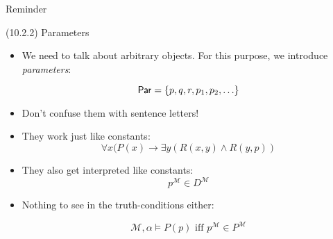 \begin{frame}{Reminder}
\begin{center}
				\end{center}
				
				

\end{frame}

\begin{frame}{(10.2.2) Parameters}

	\begin{itemize}
		
		\item We need to talk about arbitrary objects. For this purpose, we introduce \emph{parameters}:
		
		\[\mathsf{Par}=\{p,q,r,p_1, p_2, \mathellipsis\}\]
		
		\item Don't confuse them with sentence letters!
		
		\item They work just like constants: \[\forall x(P(x)\to \exists y(R(x,y)\land R(y,p))\]
		
		\item They also get interpreted like constants: \[p^\mathcal{M}\in D^\mathcal{M}\]
		
		\item Nothing to see in the truth-conditions either:
		
		\[\mathcal{M},\alpha\vDash P(p)\text{ iff }p^\mathcal{M}\in P^\mathcal{M}\]
	
	\end{itemize}


\end{frame}

